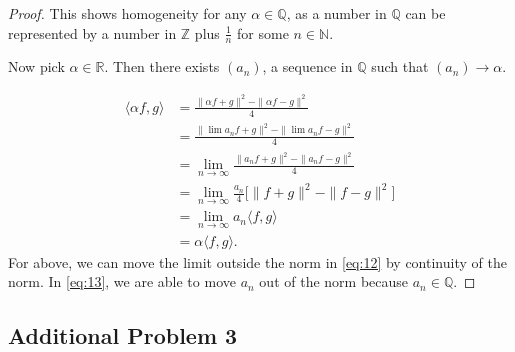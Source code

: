 \documentclass[12pt]{amsart}
\newcommand{\R}{\mathbb{R}}
\newcommand{\N}{\mathbb{N}}
\newcommand{\Z}{\mathbb{Z}}
\newcommand{\Q}{\mathbb{Q}}
\newcommand{\qal}[1]{\begin{align}#1\end{align}}
\newcommand{\<}{\langle}
\renewcommand{\>}{\rangle}
\renewcommand{\-}[1]{\overline{#1}}
\begin{document}
\begin{proof}
    This shows homogeneity for any $\alpha \in \Q$, as a number in $\Q$ can be represented by a number in $\Z$ plus $\frac{1}{n}$ for some $n \in \N$.

    Now pick $\alpha \in \R$. Then there exists $(a_n)$, a sequence in $\Q$ such that $(a_n) \to \alpha$.

    \qal{ \<\alpha f, g\> &= \frac{\|\alpha f + g\|^2 - \|\alpha f - g\|^2}{4} \nonumber\\
    &= \frac{\|\lim a_n f + g\|^2 - \| \lim a_n f - g\|^2}{4} \nonumber\\
    &= \lim_{n \to \infty} \frac{\|a_n f + g\|^2 - \|a_n f - g\|^2}{4} \label{eq:12}\\
    &= \lim_{n \to \infty} \frac{a_n}{4} \big[ \|f+g\|^2 - \|f-g\|^2\big] \label{eq:13}\\
    &= \lim_{n \to \infty} a_n \<f, g\> \nonumber \\
    &= \alpha \<f, g\>. \nonumber}
    For above, we can move the limit outside the norm in \eqref{eq:12} by continuity of the norm. In \eqref{eq:13}, we are able to move $a_n$ out of the norm because $a_n \in \Q$. 
\end{proof}

\subsection*{Additional Problem 3}
\end{document}
